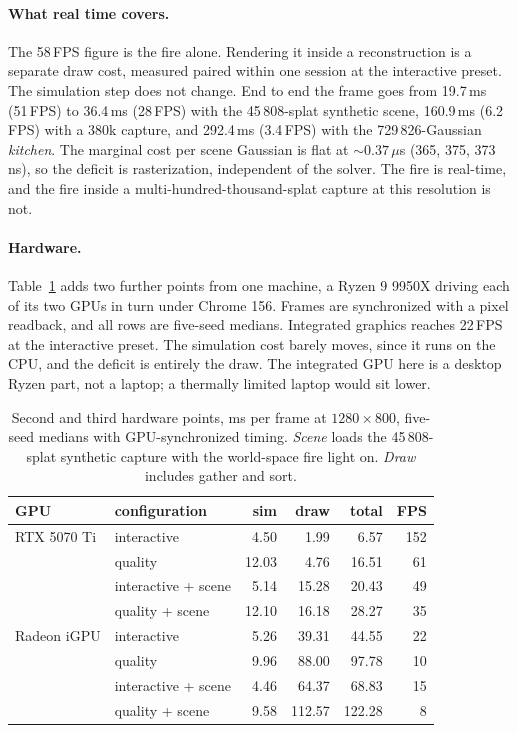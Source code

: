 \documentclass[acmtog,nonacm]{acmart}
\begin{document}
\paragraph{What real time covers.} The 58\,FPS figure is the fire alone. Rendering it inside a reconstruction is a separate draw cost, measured paired within one session at the interactive preset. The simulation step does not change. End to end the frame goes from 19.7\,ms (51\,FPS) to 36.4\,ms (28\,FPS) with the 45\,808-splat synthetic scene, 160.9\,ms (6.2\,FPS) with a 380k capture, and 292.4\,ms (3.4\,FPS) with the 729\,826-Gaussian \emph{kitchen}. The marginal cost per scene Gaussian is flat at $\sim\!0.37\,\mu$s (365, 375, 373\,ns), so the deficit is rasterization, independent of the solver. The fire is real-time, and the fire inside a multi-hundred-thousand-splat capture at this resolution is not.

\paragraph{Hardware.} Table~\ref{tab:hw} adds two further points from one machine, a Ryzen 9 9950X driving each of its two GPUs in turn under Chrome 156. Frames are synchronized with a pixel readback, and all rows are five-seed medians. Integrated graphics reaches 22\,FPS at the interactive preset. The simulation cost barely moves, since it runs on the CPU, and the deficit is entirely the draw. The integrated GPU here is a desktop Ryzen part, not a laptop; a thermally limited laptop would sit lower.

\begin{table}
\caption{Second and third hardware points, ms per frame at $1280\times800$, five-seed medians with GPU-synchronized timing. \emph{Scene} loads the 45\,808-splat synthetic capture with the world-space fire light on. \emph{Draw} includes gather and sort.}
\label{tab:hw}
\footnotesize
\begin{tabular}{llrrrr}
\toprule
GPU & configuration & sim & draw & total & FPS \\
\midrule
RTX 5070 Ti & interactive & 4.50 & 1.99 & 6.57 & 152 \\
 & quality & 12.03 & 4.76 & 16.51 & 61 \\
 & interactive + scene & 5.14 & 15.28 & 20.43 & 49 \\
 & quality + scene & 12.10 & 16.18 & 28.27 & 35 \\
\midrule
Radeon iGPU & interactive & 5.26 & 39.31 & 44.55 & 22 \\
 & quality & 9.96 & 88.00 & 97.78 & 10 \\
 & interactive + scene & 4.46 & 64.37 & 68.83 & 15 \\
 & quality + scene & 9.58 & 112.57 & 122.28 & 8 \\
\bottomrule
\end{tabular}
\end{table}
\end{document}

